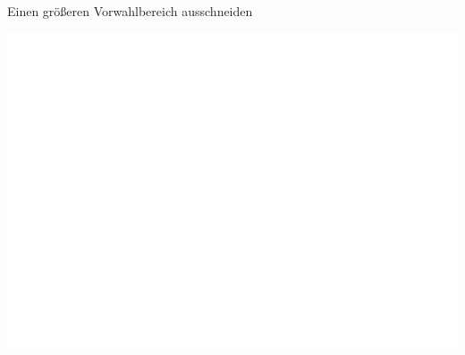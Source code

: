 \begin{frame}[fragile]{Einen größeren Vorwahlbereich ausschneiden}

\begin{Shaded}
\begin{Highlighting}[]
\StringTok{ }\OperatorTok{$}
\StringTok{ }\NormalTok{,}\NormalTok{)}
\StringTok{ }\NormalTok{onb[vwb1}\OperatorTok{==}\NormalTok{,]}
\end{Highlighting}
\end{Shaded}

\includegraphics{ps_user_stuttgart_part3_files/figure-beamer/unnamed-chunk-17-1.pdf}

\end{frame}

